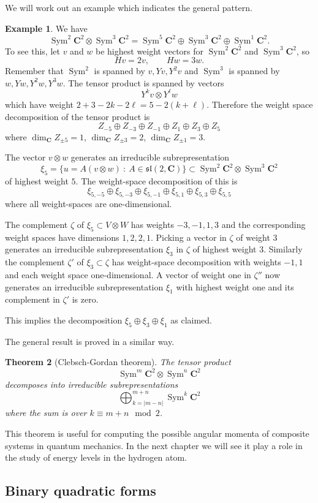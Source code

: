 \documentclass[12pt]{article}
\newcommand{\CC}{\mathbf{C}}
\newcommand{\OP}{\operatorname}
\newcommand{\Sym}{\OP{Sym}}
\newtheorem{thm}{Theorem}[section]
\theoremstyle{definition}
\newtheorem{exm}[thm]{Example}
\theoremstyle{check}
\theoremstyle{remark}
\theoremstyle{TheoremNum}
\begin{document}
We will work out an example which indicates the general pattern.
\begin{exm}
We have
\[\Sym^2\CC^2\otimes\Sym^3\CC^2=\Sym^5\CC^2\oplus\Sym^3\CC^2\oplus\Sym^1\CC^2.\]
To see this, let $v$ and $w$ be highest weight vectors for $\Sym^2\CC^2$ and $\Sym^3\CC^2$, so
\[Hv=2v,\qquad Hw=3w.\]
Remember that $\Sym^2$ is spanned by $v,Yv,Y^2v$ and $\Sym^3$ is spanned by $w,Yw,Y^2w,Y^3w$. The tensor product is spanned by vectors
\[Y^kv\otimes Y^{\ell}w\]
which have weight $2+3-2k-2\ell=5-2(k+\ell)$. Therefore the weight space decomposition of the tensor product is
\[Z_{-5}\oplus Z_{-3}\oplus Z_{-1}\oplus Z_{1}\oplus Z_{3}\oplus Z_5\]
where $\dim_{\CC}Z_{\pm 5}=1$, $\dim_{\CC}Z_{\pm 3}=2$, $\dim_{\CC}Z_{\pm 1}=3$.

The vector $v\otimes w$ generates an irreducible subrepresentation
\[\xi_5=\{u=A(v\otimes w)\ :\ A\in\mathfrak{sl}(2,\CC)\}\subset\Sym^2\CC^2\otimes\Sym^3\CC^2\]
of highest weight $5$. The weight-space decomposition of this is
\[\xi_{5,-5}\oplus\xi_{5,-3}\oplus\xi_{5,-1}\oplus\xi_{5,1}\oplus\xi_{5,3}\oplus\xi_{5,5}\]
where all weight-spaces are one-dimensional.

The complement $\zeta$ of $\xi_5\subset V\otimes W$ has weights $-3,-1,1,3$ and the corresponding weight spaces have dimensions $1,2,2,1$. Picking a vector in $\zeta$ of weight $3$ generates an irreducible subrepresentation $\xi_3$ in $\zeta$ of highest weight $3$. Similarly the complement $\zeta'$ of $\xi_3\subset\zeta$ has weight-space decomposition with weights $-1,1$ and each weight space one-dimensional. A vector of weight one in $\zeta''$ now generates an irreducible subrepresentation $\xi_1$ with highest weight one and its complement in $\zeta'$ is zero.

This implies the decomposition $\xi_5\oplus\xi_3\oplus\xi_1$ as claimed.
\end{exm}
The general result is proved in a similar way.
\begin{thm}[Clebsch-Gordan theorem]
The tensor product
\[\Sym^m\CC^2\otimes\Sym^n\CC^2\]
decomposes into irreducible subrepresentations
\[\bigoplus_{k=|m-n|}^{m+n}\Sym^k\CC^2\]
where the sum is over $k\equiv m+n \mod 2$.
\end{thm}

This theorem is useful for computing the possible angular momenta of composite systems in quantum mechanics. In the next chapter we will see it play a role in the study of energy levels in the hydrogen atom.

\subsection{Binary quadratic forms}
\end{document}
